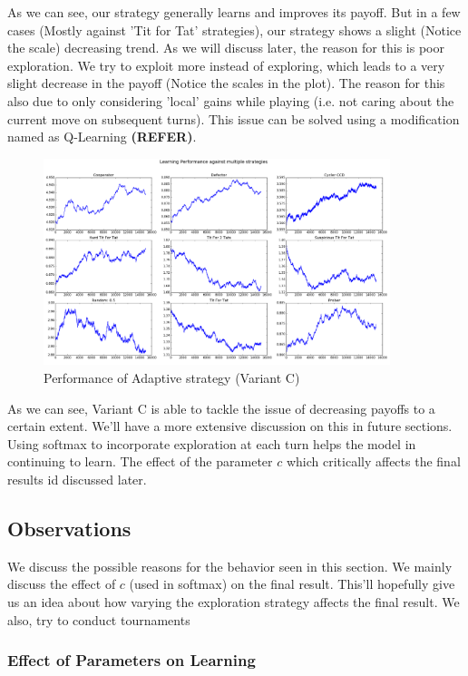 \documentclass[a4paper]{article}
\begin{document}
	As we can see, our strategy generally learns and improves its payoff. But in a few cases (Mostly against 'Tit for Tat' strategies), our strategy shows a slight (Notice the scale) decreasing trend. As we will discuss later, the reason for this is poor exploration. We try to exploit more instead of exploring, which leads to a very slight decrease in the payoff (Notice the scales in the plot). The reason for this also due to only considering 'local' gains while playing (i.e. not caring about the current move on subsequent turns). This issue can be solved using a modification named as Q-Learning \textbf{(REFER)}.

	\begin{figure}[H]
	\centering
	\includegraphics[width=0.9\textwidth]{learnerInitialC_b8.png}
	\caption{{Performance of Adaptive strategy (Variant C)}}
	\end{figure}

	As we can see, Variant C is able to tackle the issue of decreasing payoffs to a certain extent. We'll have a more extensive discussion on this in future sections. Using softmax to incorporate exploration at each turn helps the model in continuing to learn. The effect of the parameter $c$ which critically affects the final results id discussed later.  
	
	\subsection{Observations}
	
	We discuss the possible reasons for the behavior seen in this section. We mainly discuss the effect of $c$ (used in softmax) on the final result. This'll hopefully give us an idea about how varying the exploration strategy affects the final result. We also, try to conduct tournaments 	
	
	\subsubsection{Effect of Parameters on Learning}
\end{document}
